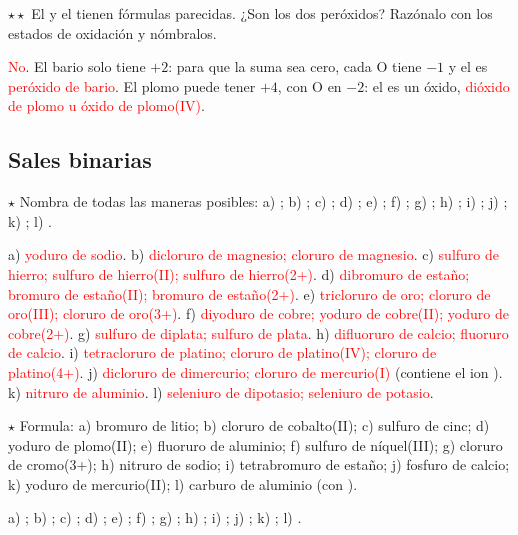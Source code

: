 \begin{exercise}
    \(\star\star\) El  y el  tienen fórmulas parecidas. ¿Son los dos peróxidos? Razónalo con los estados de
    oxidación y nómbralos.
    \begin{solu}
        \textcolor{red}{No}. El bario solo tiene \(+2\): para que la suma sea cero, cada O tiene \(-1\) y el  es
        \textcolor{red}{peróxido de bario}. El plomo puede tener \(+4\), con O en \(-2\): el  es un óxido,
        \textcolor{red}{dióxido de plomo u óxido de plomo(IV)}.
    \end{solu}
\end{exercise}

\subsection{Sales binarias}

\begin{exercise}
    \(\star\) Nombra de todas las maneras posibles: a) ; b) ; c) ; d) ; e) ; f)
    ; g) ; h) ; i) ; j) ; k) ; l) .
    \begin{solu}
        a) \textcolor{red}{yoduro de sodio}. b) \textcolor{red}{dicloruro de magnesio; cloruro de magnesio}. c)
        \textcolor{red}{sulfuro de hierro; sulfuro de hierro(II); sulfuro de hierro(2+)}. d) \textcolor{red}{dibromuro de estaño;
        bromuro de estaño(II); bromuro de estaño(2+)}. e) \textcolor{red}{tricloruro de oro; cloruro de oro(III); cloruro de
        oro(3+)}. f) \textcolor{red}{diyoduro de cobre; yoduro de cobre(II); yoduro de cobre(2+)}. g) \textcolor{red}{sulfuro de
        diplata; sulfuro de plata}. h) \textcolor{red}{difluoruro de calcio; fluoruro de calcio}. i) \textcolor{red}{tetracloruro
        de platino; cloruro de platino(IV); cloruro de platino(4+)}. j) \textcolor{red}{dicloruro de dimercurio; cloruro de
        mercurio(I)} (contiene el ion ). k) \textcolor{red}{nitruro de aluminio}. l) \textcolor{red}{seleniuro de
        dipotasio; seleniuro de potasio}.
    \end{solu}
\end{exercise}

\begin{exercise}
    \(\star\) Formula: a) bromuro de litio; b) cloruro de cobalto(II); c) sulfuro de cinc; d) yoduro de plomo(II); e) fluoruro de
    aluminio; f) sulfuro de níquel(III); g) cloruro de cromo(3+); h) nitruro de sodio; i) tetrabromuro de estaño; j) fosfuro de
    calcio; k) yoduro de mercurio(II); l) carburo de aluminio (con ).
    \begin{solu}
        a) \textcolor{red}{}; b) \textcolor{red}{}; c) \textcolor{red}{}; d) \textcolor{red}{};
        e) \textcolor{red}{}; f) \textcolor{red}{}; g) \textcolor{red}{}; h) \textcolor{red}{};
        i) \textcolor{red}{}; j) \textcolor{red}{}; k) \textcolor{red}{}; l) \textcolor{red}{}.
    \end{solu}
\end{exercise}

